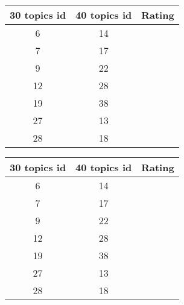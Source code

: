 \begin{table}[H]
  \begin{subtable}{.5\linewidth}
    \centering
    \begin{tabular}{c c c} \toprule
      30 topics id & 40 topics id & Rating  \\ \midrule
          6        &    14        &  \\ \midrule
          7        &    17        &  \\ \midrule
          9        &    22        &  \\ \midrule
          12       &    28        &  \\ \midrule
          19       &    38        &  \\ \midrule
          27       &    13        &  \\ \midrule
          28       &    18        &  \\ \bottomrule
    \end{tabular}
  \end{subtable}
  \begin{subtable}{.5\linewidth}
    \centering
    \begin{tabular}{c c c} \toprule
      30 topics id & 40 topics id & Rating  \\ \midrule
          6        &    14        &  \\ \midrule
          7        &    17        &  \\ \midrule
          9        &    22        &  \\ \midrule
          12       &    28        &  \\ \midrule
          19       &    38        &  \\ \midrule
          27       &    13        &  \\ \midrule
          28       &    18        &  \\ \bottomrule
    \end{tabular}
  \end{subtable}
\end{table}


